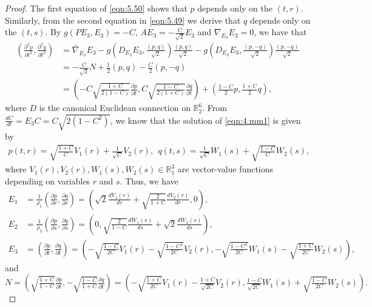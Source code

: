 \documentclass[reqno]{amsart}%
\theoremstyle{definition}
\numberwithin{equation}{section}
\begin{document}
\begin{proof}
The first equation of \eqref{eqn:5.50} shows that $p$ depends only on the $(t,r)$.
Similarly, from the second equation in \eqref{eqn:5.49} we derive that $q$ depends only on
the $(t,s)$. By $g(PE_3,E_3)=-C$, $AE_3=-\frac{C}{\sqrt{2}}E_3$ and $\nabla_{E_3}{E_3}=0$,
we have that
\begin{equation}\label{eqn:4.mm1}
\begin{aligned}
(\tfrac{\partial^2 p}{\partial t^2},\tfrac{\partial^2 q}{\partial t^2})&%
=\bar{\nabla}_{E_3}{E_3}-g( D_{E_3}{E_3},\tfrac{(p,q)}{\sqrt{2}})\tfrac{(p,q)}{\sqrt{2}}
-g( D_{E_3}{E_3},\tfrac{(p,-q)}{\sqrt{2}})\tfrac{(p,-q)}{\sqrt{2}}\\
&=-\tfrac{C}{\sqrt{2}}N+\tfrac{1}{2}(p,q)-\tfrac{C}{2}(p,-q)\\
&=(-C\sqrt{\tfrac{1+C}{2(1-C)}}\tfrac{\partial p}{\partial t},C\sqrt{\tfrac{1-C}{2(1+C)}}\tfrac{\partial q}{\partial t})+(\tfrac{1-C}{2}p,\tfrac{1+C}{2}q),
\end{aligned}
\end{equation}
where $D$ is the canonical Euclidean connection on $\mathbb{R}_2^6$.
From $\frac{dC}{dt}=E_3C=C\sqrt{2(1-C^2)}$, we know that the solution of
\eqref{eqn:4.mm1} is given by
\begin{equation}\label{eqn:pq}
\begin{aligned}
p(t,r)=\sqrt{\tfrac{1+C}{C}}V_1(r)+\tfrac{1}{\sqrt{C}}V_2(r),\ \
q(t,s)=\tfrac{1}{\sqrt{C}}W_1(s)+\sqrt{\tfrac{1-C}{C}}W_2(s),
\end{aligned}
\end{equation}
where $V_1(r),V_2(r),W_1(s),W_2(s)\in \mathbb{R}_1^3$ are vector-value functions depending on variables $r$ and $s$. Thus, we have
$$
\begin{aligned}
E_1&=\tfrac{1}{\rho_1}(\tfrac{\partial p}{\partial r},\tfrac{\partial q}{\partial r})
=(\sqrt{2}\tfrac{d V_1(r)}{dr}+\sqrt{\tfrac{2}{1+C}}\tfrac{d V_2(r)}{dr},0),\\
E_2&=\tfrac{1}{\rho_2}(\tfrac{\partial p}{\partial s},\tfrac{\partial q}{\partial s})
=(0,\sqrt{\tfrac{2}{1-C}}\tfrac{d W_1(s)}{ds}+\sqrt{2}\tfrac{d W_2(s)}{ds}),\\
E_3&=(\tfrac{\partial p}{\partial t},\tfrac{\partial q}{\partial t})
=(-\sqrt{\tfrac{1-C}{2C}}V_1(r)-\sqrt{\tfrac{1-C^2}{2C}}V_2(r),
-\sqrt{\tfrac{1-C^2}{2C}}W_1(s)-\sqrt{\tfrac{1+C}{2C}}W_2(s)),
\end{aligned}
$$
and
$$
N=(\sqrt{\tfrac{1+C}{1-C}}\tfrac{\partial p}{\partial t},-\sqrt{\tfrac{1-C}{1+C}}\tfrac{\partial q}{\partial t})
=(-\sqrt{\tfrac{1+C}{2C}}V_1(r)-\tfrac{1+C}{\sqrt{2C}}V_2(r),
\tfrac{1-C}{\sqrt{2C}}W_1(s)+\sqrt{\tfrac{1-C}{2C}}W_2(s)).
$$




\end{proof}
\end{document}
